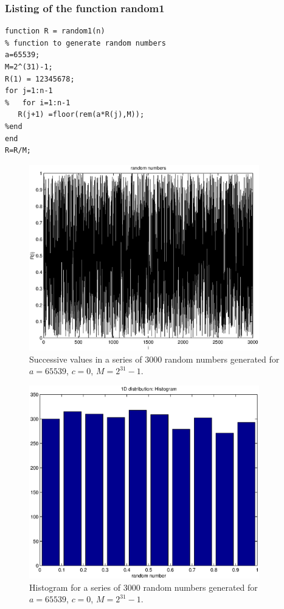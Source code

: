 \subsubsection{Listing of the function {\sf random1}}
\begin{verbatim}
function R = random1(n)
% function to generate random numbers
a=65539;
M=2^(31)-1;
R(1) = 12345678;
for j=1:n-1
%   for i=1:n-1
   R(j+1) =floor(rem(a*R(j),M));
%end
end
R=R/M;
\end{verbatim}

\begin{figure}
\label{F_TRANDOM2_1}
\includegraphics[width=10cm]{./Figures/f_trandom2_1.eps}
\caption{Successive values in a series of 3000 random numbers generated
for $a=65539$, $c=0$, $M=2^{31}-1$.}
\end{figure}

\begin{figure}
\label{F_TRANDOM2_2}
\includegraphics[width=10cm]{./Figures/f_trandom2_2.eps}
\caption{Histogram for a series of 3000 random numbers generated
for $a=65539$, $c=0$, $M=2^{31}-1$.}
\end{figure}

